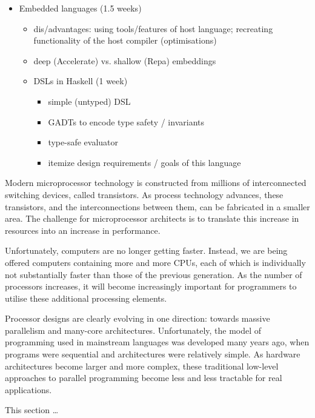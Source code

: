\begin{itemize}
\item Embedded languages (1.5 weeks)
    \begin{itemize}
        \item dis/advantages: using tools/features of host language; recreating
            functionality of the host compiler (optimisations)
        \item deep (Accelerate) vs. shallow (Repa) embeddings
        \item DSLs in Haskell (1 week)
            \begin{itemize}
                \item simple (untyped) DSL
                \item GADTs to encode type safety / invariants
                \item type-safe evaluator
                \item itemize design requirements / goals of this language
            \end{itemize}
    \end{itemize}
\end{itemize}



Modern microprocessor technology is constructed from millions of interconnected
switching devices, called transistors. As process technology advances, these
transistors, and the interconnections between them, can be fabricated in a
smaller area. The challenge for microprocessor architects is to translate this
increase in resources into an increase in performance.

Unfortunately, computers are no longer getting faster. Instead, we are being
offered computers containing more and more CPUs, each of which is individually
not substantially faster than those of the previous generation. As the number of
processors increases, it will become increasingly important for programmers to
utilise these additional processing elements.

Processor designs are clearly evolving in one direction: towards massive
parallelism and many-core architectures. Unfortunately, the model of programming
used in mainstream languages was developed many years ago, when programs were
sequential and architectures were relatively simple. As hardware architectures
become larger and more complex, these traditional low-level approaches to
parallel programming become less and less tractable for real applications.

This section \ldots


